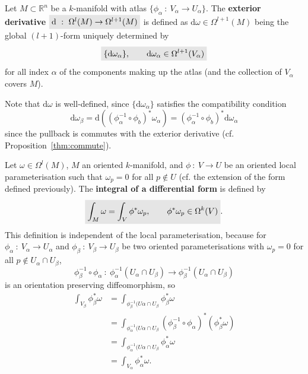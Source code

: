 \documentclass[letter-paper]{tufte-book}
\newcommand{\highlight}[1]{\mathchoice%
  {\colorbox{black!10}{$\displaystyle#1$}}%
  {\colorbox{black!10}{$\textstyle#1$}}%
  {\colorbox{black!10}{$\scriptstyle#1$}}%
  {\colorbox{black!10}{$\scriptscriptstyle#1$}}}%
\begin{document}
Let $M \subset \mathbb{R}^n$ be a $k$-manifold with atlas $\{\phi_\alpha\ :\ V_\alpha \to U_\alpha\}$. The \textbf{exterior derivative} $\highlight{\mathrm{d}\ :\ \Omega^l(M) \to \Omega^{l+1}(M)}$ is defined as $\mathrm{d}\omega \in \Omega^{l+1}(M)$ being the global $(l+1)$-form uniquely determined by
\begin{equation}
  \highlight{\{\mathrm{d}\omega_\alpha\}, \qquad \mathrm{d}\omega_\alpha \in \Omega^{l+1}(V_\alpha)}
\end{equation}
for all index $\alpha$ of the components making up the atlas (and the collection of $V_\alpha$ covers $M$).

Note that $\mathrm{d}\omega$ is well-defined, since $\{\mathrm{d}\omega_\alpha\}$ satisfies the compatibility condition
\begin{equation*}
  \mathrm{d}\omega_\beta = \mathrm{d}((\phi_\alpha^{-1} \circ \phi_b)^* \omega_\alpha) = (\phi_\alpha^{-1} \circ \phi_b)^*\mathrm{d}\omega_\alpha
\end{equation*}
since the pullback is commutes with the exterior derivative (cf. Proposition~\ref{thm:commute}).

Let $\omega \in \Omega^l(M)$, $M$ an oriented $k$-manifold, and $\phi\ :\ V \to U$ be an oriented local parameterisation such that $\omega_p = 0$ for all $p \not\in U$ (cf. the extension of the form defined previously). The \textbf{integral of a differential form} is defined by
\begin{equation}
  \highlight{\int_M \omega = \int_V \phi^*\omega_p, \qquad \phi^*\omega_p \in \Omega^k(V)}.
\end{equation}
This definition is independent of the local parameterisation, because for $\phi_\alpha\ :\ V_\alpha \to U_\alpha$ and $\phi_\beta\ :\ V_\beta \to U_\beta$ be two oriented parameterisations with $\omega_p=0$ for all $p \not\in U_\alpha \cap U_\beta$,
\begin{equation*}
  \phi_\beta^{-1} \circ \phi_\alpha\ :\ \phi_\alpha^{-1}(U_\alpha \cap U_\beta) \to \phi_\beta^{-1}(U_\alpha \cap U_\beta)
\end{equation*}
is an orientation preserving diffeomorphism, so
\begin{align*}
  \int_{V_\beta} \phi_\beta^* \omega
    &= \int_{\phi_\beta^{-1}(U\alpha \cap U_\beta} \phi_\beta^* \omega\\
    &= \int_{\phi_\alpha^{-1}(U\alpha \cap U_\beta} (\phi_\beta^{-1} \circ \phi_\alpha)^*(\phi_\beta^* \omega)\\
    &= \int_{\phi_\alpha^{-1}(U\alpha \cap U_\beta} \phi_\alpha^* \omega\\
    &= \int_{V_\alpha} \phi_\alpha^* \omega.
\end{align*}
\end{document}
